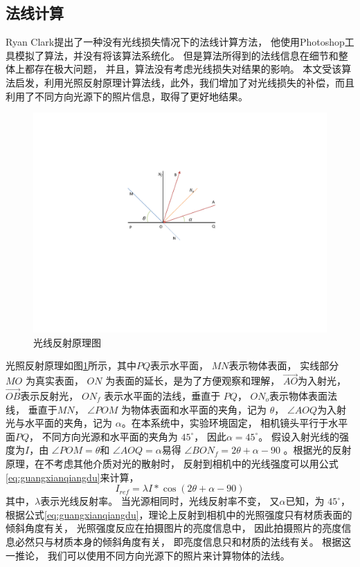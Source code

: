 \subsection{法线计算}


 Ryan Clark\cite{zarria.net}提出了一种没有光线损失情况下的法线计算方法，
 他使用Photoshop工具模拟了算法，并没有将该算法系统化。
 但是算法所得到的法线信息在细节和整体上都存在极大问题，
 并且，算法没有考虑光线损失对结果的影响。
 本文受该算法启发，利用光照反射原理计算法线，此外，我们增加了对光线损失的补偿，而且利用了不同方向光源下的照片信息，取得了更好地结果。

\begin{figure}[htbp]
\centering
\includegraphics[width=0.6\linewidth]{figures/guangxianfanshetu.pdf}
\caption{光线反射原理图}
\label{fig:guangxianfanshetu}
\end{figure}

光照反射原理如图\ref{fig:guangxianfanshetu}所示，其中$PQ$表示水平面，
$MN$表示物体表面，
实线部分$MO$
为真实表面，
$ON$
为表面的延长，是为了方便观察和理解，
$\overrightarrow{AO}$为入射光，
$\overrightarrow{OB}$表示反射光，
$ON_f$
表示水平面的法线，垂直于
$PQ$，
$ON_o$表示物体表面法线，
垂直于$MN$，
$\angle POM$
为物体表面和水平面的夹角，记为
$\theta $，
$\angle AOQ$为入射光与水平面的夹角，记为
$\alpha$。在本系统中，实验环境固定，
相机镜头平行于水平面$PQ$，
不同方向光源和水平面的夹角为
$45^{\circ}$，
因此$\alpha=45^{\circ}$。
假设入射光线的强度为$I$，由
$\angle POM=\theta$和
$\angle AOQ=\alpha$易得
$\angle {BON}_f=2\theta+\alpha-90$
。根据光的反射原理，在不考虑其他介质对光的散射时，
反射到相机中的光线强度可以用公式\eqref{eq:guangxianqiangdu}来计算，
\begin{equation}
\label{eq:guangxianqiangdu}
I_{ref}=\lambda I* \cos (2\theta +\alpha-90)
\end{equation}
其中，$\lambda$表示光线反射率。
当光源相同时，光线反射率不变，
又$\alpha$已知，为
$45^{\circ}$，
根据公式\eqref{eq:guangxianqiangdu}，理论上反射到相机中的光照强度只有材质表面的倾斜角度有关，
光照强度反应在拍摄图片的亮度信息中，
因此拍摄照片的亮度信息必然只与材质本身的倾斜角度有关，
即亮度信息只和材质的法线有关。
根据这一推论，
我们可以使用不同方向光源下的照片来计算物体的法线。

